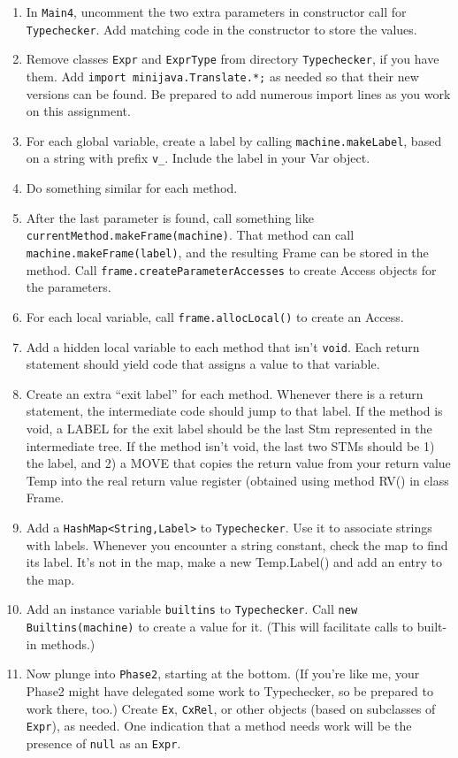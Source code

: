 \documentclass[11pt]{article}
\begin{document}
\begin{enumerate}
\item In \verb'Main4', uncomment the two extra parameters in constructor call for \verb'Typechecker'.  Add matching code in the constructor to store the values.
\item Remove classes \verb'Expr' and \verb'ExprType' from directory \verb'Typechecker', if you have them.  Add \verb'import minijava.Translate.*;' as needed so that their new versions can be found. Be prepared to add numerous import lines as you work on this assignment.
\item For each global variable, create a label by calling \verb'machine.makeLabel', based on a string with prefix \verb'v_'.  Include the label in your Var object.
\item Do something similar for each method.
\item After the last parameter is found, call something like \verb'currentMethod.makeFrame(machine)'.  That method can call \verb'machine.makeFrame(label)', and the resulting Frame can be stored in the method.  Call \verb'frame.createParameterAccesses' to create Access objects for the parameters.
\item For each local variable, call \verb'frame.allocLocal()' to create an Access.
\item Add a hidden local variable to each method that isn't \verb'void'.  Each return statement should yield code that assigns a value to that variable.
\item Create an extra ``exit label'' for each method.  Whenever there is a return statement, the intermediate code should jump to that label.  If the method is void, a LABEL for the exit label should be the last Stm represented in the intermediate tree.  If the method isn't void, the last two STMs should be 1) the label, and 2) a MOVE that copies the return value from your return value Temp into the real return value register (obtained using method RV() in class Frame.
\item Add a \verb'HashMap<String,Label>' to \verb'Typechecker'.  Use it to associate strings with labels.  Whenever you encounter a string constant, check the map to find its label.  It's not in the map, make a new Temp.Label() and add an entry to the map.
\item Add an instance variable \verb'builtins' to \verb'Typechecker'.  Call \verb'new Builtins(machine)' to create a value for it.  (This will facilitate calls to built-in methods.)
\item Now plunge into \verb'Phase2', starting at the bottom.  (If you're like me, your Phase2 might have delegated some work to Typechecker, so be prepared to work there, too.)  Create \verb'Ex', \verb'CxRel', or other objects (based on subclasses of \verb'Expr'), as needed.  One indication that a method needs work will be the presence of \verb'null' as an \verb'Expr'.

\end{enumerate}
\end{document}
